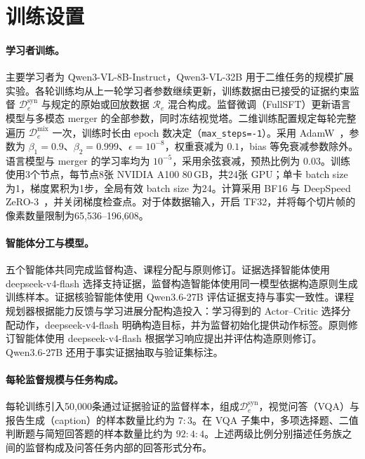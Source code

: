 

\section{训练设置}
\label{app:implementation}

\paragraph{学习者训练。}
主要学习者为 Qwen3-VL-8B-Instruct，Qwen3-VL-32B 用于二维任务的规模扩展实验。各轮训练均从上一轮学习者参数继续更新，训练数据由已接受的证据约束监督 $\mathcal D_e^{\mathrm{syn}}$ 与规定的原始或回放数据 $\mathcal R_e$ 混合构成。监督微调（FullSFT）更新语言模型与多模态 merger 的全部参数，同时冻结视觉塔。二维训练配置规定每轮完整遍历 $\mathcal D_e^{\mathrm{mix}}$ 一次，训练时长由 epoch 数决定（\texttt{max\_steps=-1}）。采用 AdamW~\citep{loshchilov2019decoupled}，参数为 $\beta_1=0.9$、$\beta_2=0.999$、$\epsilon=10^{-8}$，权重衰减为 $0.1$，bias 等免衰减参数除外。语言模型与 merger 的学习率均为 $10^{-5}$，采用余弦衰减，预热比例为 $0.03$。训练使用3个节点，每节点8张 NVIDIA A100 80\,GB，共24张 GPU；单卡 batch size 为1，梯度累积为1步，全局有效 batch size 为24。计算采用 BF16 与 DeepSpeed ZeRO-3~\citep{rajbhandari2020zero}，并关闭梯度检查点。对于体数据输入，开启 TF32，并将每个切片帧的像素数量限制为65,536--196,608。
\paragraph{智能体分工与模型。}
五个智能体共同完成监督构造、课程分配与原则修订。证据选择智能体使用 deepseek-v4-flash 选择支持证据，监督构造智能体使用同一模型依据构造原则生成训练样本。证据核验智能体使用 Qwen3.6-27B 评估证据支持与事实一致性。课程规划器根据能力反馈与学习进展分配构造投入：学习得到的 Actor--Critic 选择分配动作，deepseek-v4-flash 明确构造目标，并为监督初始化提供动作标签。原则修订智能体使用 deepseek-v4-flash 根据学习响应提出并评估构造原则修订。Qwen3.6-27B 还用于事实证据抽取与验证集标注。

\paragraph{每轮监督规模与任务构成。}
每轮训练引入50,000条通过证据验证的监督样本，组成$\mathcal D_e^{\mathrm{syn}}$，视觉问答（VQA）与报告生成（caption）的样本数量比约为 $7:3$。在 VQA 子集中，多项选择题、二值判断题与简短回答题的样本数量比约为 $92:4:4$。上述两级比例分别描述任务族之间的监督构成及问答任务内部的回答形式分布。

